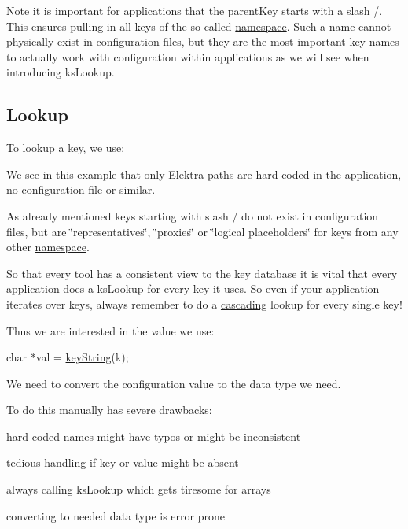 Note it is important for applications that the parent\+Key starts with a slash {\ttfamily /}. This ensures pulling in all keys of the so-\/called \hyperlink{doc_help_elektra-namespaces_md}{namespace}. Such a name cannot physically exist in configuration files, but they are the most important key names to actually work with configuration within applications as we will see when introducing {\ttfamily ks\+Lookup}.

\subsection*{Lookup}

To lookup a key, we use\+:




We see in this example that only Elektra paths are hard coded in the application, no configuration file or similar.

As already mentioned keys starting with slash {\ttfamily /} do not exist in configuration files, but are \char`\"{}representatives\char`\"{}, \char`\"{}proxies\char`\"{} or \char`\"{}logical placeholders\char`\"{} for keys from any other \hyperlink{doc_help_elektra-namespaces_md}{namespace}.

So that every tool has a consistent view to the key database it is vital that every application does a {\ttfamily ks\+Lookup} for every key it uses. So even if your application iterates over keys, always remember to do a \hyperlink{doc_tutorials_cascading_md}{cascading} lookup for every single key!

Thus we are interested in the value we use\+:


\begin{DoxyCode}
\textcolor{keywordtype}{char} *val = \hyperlink{group__keyvalue_ga880936f2481d28e6e2acbe7486a21d05}{keyString}(k);
\end{DoxyCode}


We need to convert the configuration value to the data type we need.

To do this manually has severe drawbacks\+:


\begin{DoxyItemize}
\item hard coded names might have typos or might be inconsistent
\item tedious handling if key or value might be absent
\item always calling {\ttfamily ks\+Lookup} which gets tiresome for arrays
\item converting to needed data type is error prone
\end{DoxyItemize}

